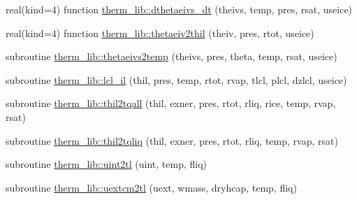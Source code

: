 \begin{DoxyCompactItemize}
\item 
real(kind=4) function \hyperlink{namespacetherm__lib_a2c2d9dff6ab1ea0e1385b7f94e322c26}{therm\+\_\+lib\+::dthetaeivs\+\_\+dt} (theivs, temp, pres, rsat, useice)
\item 
real(kind=4) function \hyperlink{namespacetherm__lib_a567e8e6a001cab2a0991a88f7b7fc28f}{therm\+\_\+lib\+::thetaeiv2thil} (theiv, pres, rtot, useice)
\item 
subroutine \hyperlink{namespacetherm__lib_a8067ee37cd0529f1940178817b175cbc}{therm\+\_\+lib\+::thetaeivs2temp} (theivs, pres, theta, temp, rsat, useice)
\item 
subroutine \hyperlink{namespacetherm__lib_a0b1c333335dfb4af1c56bc56a0e45440}{therm\+\_\+lib\+::lcl\+\_\+il} (thil, pres, temp, rtot, rvap, tlcl, plcl, dzlcl, useice)
\item 
subroutine \hyperlink{namespacetherm__lib_a8fda8004633d91addcf1c6004df3bd88}{therm\+\_\+lib\+::thil2tqall} (thil, exner, pres, rtot, rliq, rice, temp, rvap, rsat)
\item 
subroutine \hyperlink{namespacetherm__lib_a0285be7469fbc289302f23bd321fce36}{therm\+\_\+lib\+::thil2tqliq} (thil, exner, pres, rtot, rliq, temp, rvap, rsat)
\item 
subroutine \hyperlink{namespacetherm__lib_a6ded17767672913967afa919fef33015}{therm\+\_\+lib\+::uint2tl} (uint, temp, fliq)
\item 
subroutine \hyperlink{namespacetherm__lib_ac588ab0dc1c0c52c4c41b847be134ee9}{therm\+\_\+lib\+::uextcm2tl} (uext, wmass, dryhcap, temp, fliq)
\end{DoxyCompactItemize}
